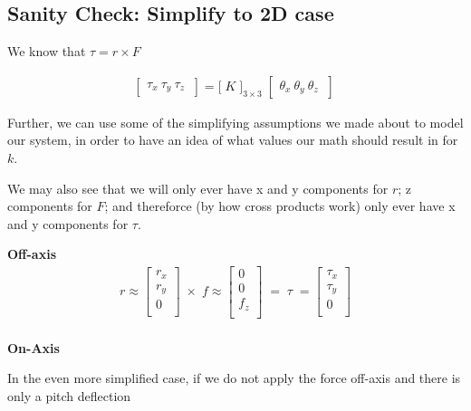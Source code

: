 \documentclass[preprint,12pt,3p]{elsarticle}
\begin{document}
\subsection{Sanity Check: Simplify to 2D case}

We know that $\tau = r \times F$

\begin{align}
    \begin{bmatrix}
        \tau_{x} \
        \tau_{y} \
        \tau_{z} \
    \end{bmatrix} =
    \Bigg[ \; K \; \Bigg]_{3\times3} \;
    \begin{bmatrix}
        \theta_{x} \
        \theta_{y} \
        \theta_{z} \
    \end{bmatrix} \
\end{align}

Further, we can use some of the simplifying assumptions we made about to model our system, in order to have an idea of what values our math should result in for $k$.

We may also see that we will only ever have x and y components for $r$; z components for $F$; and thereforce (by how cross products work) only ever have x and y components for $\tau$.

\textbf{Off-axis}
\begin{align}
r \approx
\begin{bmatrix}
    r_x       \\
    r_y       \\
    0       \\
\end{bmatrix} \; \times \;
f \approx
\begin{bmatrix}
    0       \\
    0       \\
    f_z      \\
\end{bmatrix} \; =  \; \tau \; = 
\begin{bmatrix}
    \tau_x       \\
    \tau_y       \\
    0      \\
\end{bmatrix}\\
\end{align}


\textbf{On-Axis}

In the even more simplified case, if we do not apply the force off-axis and there is only a pitch
deflection
\end{document}
